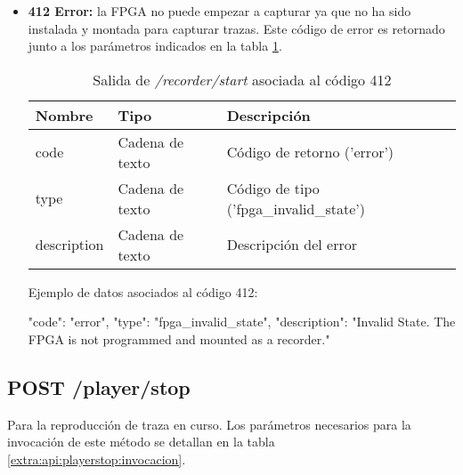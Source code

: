 \begin{itemize}
{\begin{minipage}{\textwidth}
Ejemplo de datos asociados al código 400:

\begin{code}[language=json]
{
  "code": "error",
  "type": "notification",
  "description": "Invalid capture name (must not exist)."
}
\end{code}
\end{minipage}
}

\item{\textbf{412 Error:} la \gls{FPGA} no puede empezar a capturar ya que no ha sido instalada y montada para capturar \glspl{traza}. Este código de error es retornado junto a los parámetros indicados en la tabla \ref{extra:api:recorderstart:error412}.
\begin{table}[H]
\centering
\begin{tabular}{|l|l|l|}
\hline
\rowcolor[HTML]{F5F5F5}
\textbf{Nombre}  & \textbf{Tipo}   & \textbf{Descripción}                    \\ \hline
code             & Cadena de texto & Código de retorno ('error')             \\ \hline
type             & Cadena de texto & Código de tipo ('fpga\_invalid\_state') \\ \hline
description      & Cadena de texto & Descripción del error                   \\ \hline
\end{tabular}
\caption{Salida de \textit{/recorder/start} asociada al código 412}
\label{extra:api:recorderstart:error412}
\end{table}

\begin{minipage}{\textwidth}
Ejemplo de datos asociados al código 412:

\begin{code}[language=json]
{
  "code": "error",
  "type": "fpga_invalid_state",
  "description": "Invalid State. The FPGA is not programmed and mounted as a recorder."
}
\end{code}
\end{minipage}
}

\end{itemize}

%
%
\subsection{POST /player/stop}
Para la reproducción de \gls{traza} en curso. Los parámetros necesarios para la invocación de este método se detallan en la tabla \ref{extra:api:playerstop:invocacion}.

